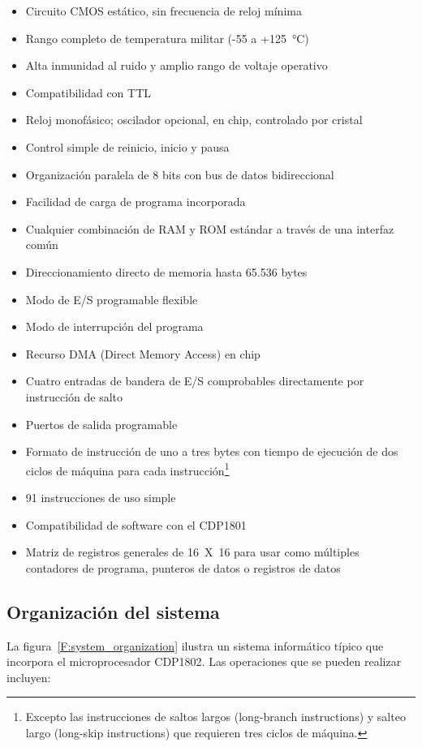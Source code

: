 \begin{itemize}
    \item Circuito CMOS estático, sin frecuencia de reloj mínima
    \item Rango completo de temperatura militar (-55 a +125~\unit{\degreeCelsius})
    \item Alta inmunidad al ruido y amplio rango de voltaje operativo
    \item Compatibilidad con TTL
    \item Reloj monofásico; oscilador opcional, en chip, controlado por cristal
    \item Control simple de reinicio, inicio y pausa
    \item Organización paralela de 8 bits con bus de datos bidireccional
    \item Facilidad de carga de programa incorporada
    \item Cualquier combinación de RAM y ROM estándar a través de una interfaz común
    \item Direccionamiento directo de memoria hasta 65.536 bytes
    \item Modo de E/S programable flexible
    \item Modo de interrupción del programa
    \item Recurso DMA (Direct Memory Access) en chip
    \item Cuatro entradas de bandera de E/S comprobables directamente por instrucción de salto
    \item Puertos de salida programable
    \item Formato de instrucción de uno a tres bytes con tiempo de ejecución de dos ciclos de máquina para cada instrucción\footnote{Excepto las instrucciones de saltos largos (long-branch instructions) y salteo largo (long-skip instructions) que requieren tres ciclos de máquina.}
    \item 91 instrucciones de uso simple
    \item Compatibilidad de software con el CDP1801
    \item Matriz de registros generales de 16~X~16 para usar como múltiples contadores de programa, punteros de datos o registros de datos
\end{itemize}

\subsection{Organización del sistema}

La figura~\ref{F:system_organization} ilustra un sistema informático típico que incorpora el microprocesador CDP1802. Las operaciones que se pueden realizar incluyen:

